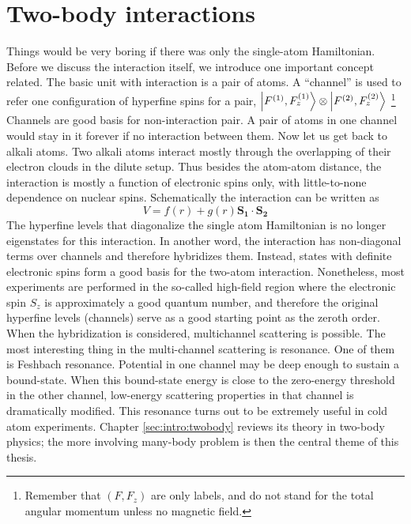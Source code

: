 \section{Two-body interactions}
Things would be very boring if there was only the single-atom Hamiltonian.  Before we discuss the interaction itself, we introduce one important concept related.   The basic unit with interaction is a pair of atoms.  A ``channel'' is used to refer one  configuration of hyperfine spins for a pair, $\left|F^{(1)},F_{z}^{(1)}\right>\otimes\left|F^{(2)},F_{z}^{(2)}\right>$  \footnote{Remember that $(F,F_{z})$ are only labels, and do not stand for the total angular momentum unless no magnetic field.\label{foot:intro:f}}    Channels are good basis for non-interaction pair.  A pair of atoms in one channel would stay in it forever if no interaction between them.  Now let us get back to alkali atoms.  Two alkali atoms interact mostly through the overlapping of their electron clouds in the dilute setup.  Thus besides the atom-atom distance, the interaction is mostly a function of electronic spins only, with little-to-none dependence on nuclear spins.  Schematically the interaction can be written as 
\begin{equation}\label{eq:intro:two}
V=f(r)+g(r)\mathbf{S_{1}}\cdot\mathbf{S_{2}}
\end{equation}
The hyperfine levels that diagonalize the single atom Hamiltonian is no longer eigenstates for this interaction.  In another word, the interaction has non-diagonal terms over channels and therefore hybridizes them. Instead, states with definite electronic spins form a good basis for the two-atom interaction.  Nonetheless, most experiments are performed in the so-called high-field region where the electronic spin $S_z$ is approximately a good quantum number, and therefore the original hyperfine levels (channels) serve as a good starting point as the zeroth order.  When the hybridization is considered, multichannel scattering is possible.  The most interesting thing in the multi-channel scattering is resonance.  One of them is Feshbach resonance.  Potential in one channel may be deep enough to sustain a bound-state. When this bound-state energy is close to the zero-energy threshold in the other channel, low-energy scattering properties in that channel is dramatically modified.  This resonance turns out to be extremely useful in   cold atom experiments.  Chapter \ref{sec:intro:twobody} reviews its theory in  two-body physics; the more involving many-body problem is then the central theme of this thesis. 

